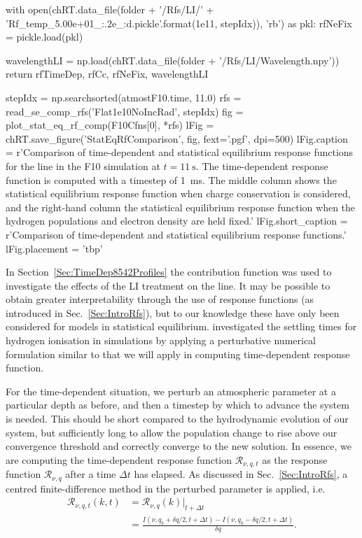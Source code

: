 \begin{pycode}[TimeDepRT]
    with open(chRT.data_file(folder + '/Rfs/LI/' + 'Rf_temp_5.00e+01_{:.2e}_{:d}.pickle'.format(1e11, stepIdx)), 'rb') as pkl:
        rfNeFix = pickle.load(pkl)

    wavelengthLI = np.load(chRT.data_file(folder + '/Rfs/LI/Wavelength.npy'))
    return rfTimeDep, rfCc, rfNeFix, wavelengthLI

stepIdx = np.searchsorted(atmostF10.time, 11.0)
rfs = read_se_comp_rfs('Flat1e10NoIncRad', stepIdx)
fig = plot_stat_eq_rf_comp(F10Cfns[0], *rfs)
lFig = chRT.save_figure('StatEqRfComparison', fig, fext='.pgf', dpi=500)
lFig.caption = r'Comparison of time-dependent and statistical equilibrium response functions for the \CaLine{} line in the F10 simulation at $t=\SI{11}{\s}$. The time-dependent response function is computed with a timestep of \SI{1}{\milli\s}. The middle column shows the statistical equilibrium response function when charge conservation is considered, and the right-hand column the statistical equilibrium response function when the hydrogen populations and electron density are held fixed.'
lFig.short_caption = r'Comparison of time-dependent and statistical equilibrium response functions.'
lFig.placement = 'tbp'
\end{pycode}


In Section~\ref{Sec:TimeDep8542Profiles} the contribution function was used to investigate the effects of the LI treatment on the \CaLine{} line.
It may be possible to obtain greater interpretability through the use of response functions (as introduced in Sec.~\ref{Sec:IntroRfs}), but to our knowledge these have only been considered for models in statistical equilibrium.
\citet{Carlsson2002} investigated the settling times for hydrogen ionisation in \Radyn{} simulations by applying a perturbative numerical formulation similar to that we will apply in computing time-dependent response function.

For the time-dependent situation, we perturb an atmospheric parameter at a particular depth as before, and then a timestep by which to advance the system is needed.
This should be short compared to the hydrodynamic evolution of our system, but sufficiently long to allow the population change to rise above our convergence threshold and correctly converge to the new solution.
In essence, we are computing the time-dependent response function $\mathcal{R}_{\nu, q,t}$ as the response function $\mathcal{R}_{\nu, q}$ after a time $\Delta t$ has elapsed.
As discussed in Sec.~\ref{Sec:IntroRfs}, a centred finite-difference method in the perturbed parameter is applied, i.e.
\begin{equation}
\begin{aligned}
    \mathcal{R}_{\nu, q, t}(k, t) &= \mathcal{R}_{\nu, q}(k) \bigg|_{t + \Delta t}\\
    &= \frac{I(\nu, q_k + \delta q /2, t + \Delta t) - I(\nu, q_k - \delta q / 2, t+\Delta t)}{\delta q}.
\end{aligned}
\end{equation}


